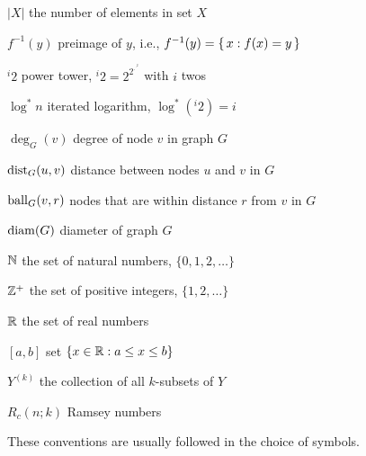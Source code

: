 

{\raggedright
\begin{notation}
    \item[$|X|$] the number of elements in set $X$
    \item[$f^{-1}(y)$] preimage of $y$, i.e., $f^{-1}(y) = \{\,  x : f(x) = y  \,\}$
    \item[${}^i 2$] power tower, ${}^i 2 = 2^{2^{\cdot^{\cdot^2}}}$ with $i$ twos
    \item[$\log^* n$] iterated logarithm, $\log^*({}^i 2) = i$
    \item[$\deg_G(v)$] degree of node $v$ in graph $G$
    \item[$\operatorname{dist}_G(u,v)$] distance between nodes $u$ and $v$ in $G$
    \item[$\operatorname{ball}_G(v,r)$] nodes that are within distance $r$ from $v$ in $G$
    \item[$\operatorname{diam}(G)$] diameter of graph $G$
    \item[$\mathbb{N}$] the set of natural numbers, $\{0,1,2,\dotsc\}$
    \item[$\mathbb{Z}^+$] the set of positive integers, $\{1,2,\dotsc\}$
    \item[$\mathbb{R}$] the set of real numbers
    \item[{$[a,b]$}] set $\{x \in \mathbb{R} : a \le x \le b\}$
    \item[$Y^{(k)}$] the collection of all $k$-subsets of $Y$
    \item[$R_c(n;k)$] Ramsey numbers
\end{notation}}


These conventions are usually followed in the choice of symbols.


